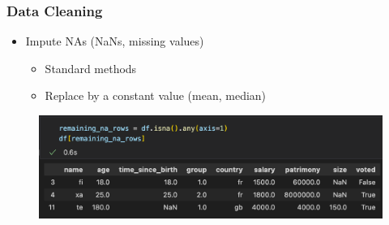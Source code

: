 \begin{frame}\frametitle{Data Cleaning}
   \begin{itemize}
      \item Impute NAs (NaNs, missing values)
      \begin{itemize}
         \item Standard methods
         \item Replace by a constant value (mean, median)
      \end{itemize}
   \end{itemize}
   \vspace{.5cm}
   \begin{minipage}{0.58\linewidth}
      \begin{figure}[H]
         \includegraphics[scale=.35]{../images/illustrations/data_cleaning_na_imputation_const_1.png}
      \end{figure}
   \end{minipage}


\end{frame}
